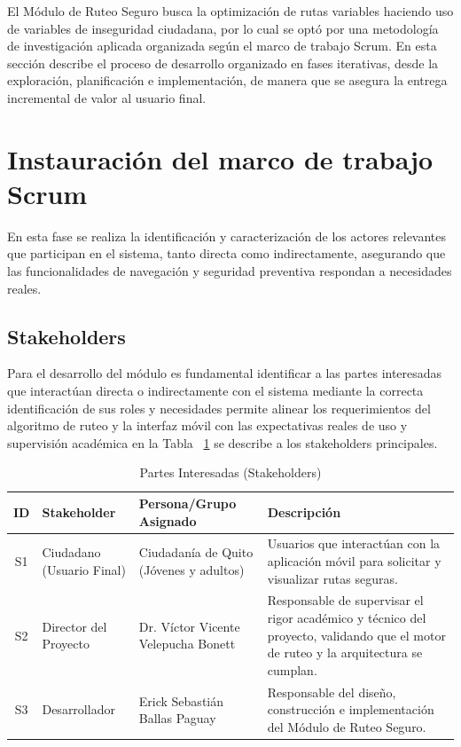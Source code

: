 El Módulo de Ruteo Seguro busca la optimización de rutas variables haciendo uso de variables de inseguridad ciudadana, por lo cual se optó por una metodología de investigación aplicada organizada según el marco de trabajo Scrum. En esta sección describe el proceso de desarrollo organizado en fases iterativas, desde la exploración, planificación e implementación, de manera que se asegura la entrega incremental de valor al usuario final.

\section{Instauración del marco de trabajo Scrum}
En esta fase se realiza la identificación y caracterización de los actores relevantes que participan en el sistema, tanto directa como indirectamente, asegurando que las funcionalidades de navegación y seguridad preventiva respondan a necesidades reales.

\subsection{Stakeholders}
Para el desarrollo del módulo es fundamental identificar a las partes interesadas que interactúan directa o indirectamente con el sistema mediante la correcta identificación de sus roles y necesidades permite alinear los requerimientos del algoritmo de ruteo y la interfaz móvil con las expectativas reales de uso y supervisión académica en la Tabla ~\ref{tab:stakeholders} se describe a los stakeholders principales. 

\begin{table}[H]
\caption{Partes Interesadas (Stakeholders)}
\label{tab:stakeholders}
\centering
\begin{tabular}{|c|p{3cm}|p{3.5cm}|p{7cm}|}
\hline
\textbf{ID} & \textbf{Stakeholder} & \textbf{Persona/Grupo Asignado} & \textbf{Descripción} \\ \hline

S1 & Ciudadano (Usuario Final) & Ciudadanía de Quito (Jóvenes y adultos) & 
Usuarios que interactúan con la aplicación móvil para solicitar y visualizar rutas seguras. \\ \hline

S2 & Director del Proyecto & Dr. Víctor Vicente Velepucha Bonett & 
Responsable de supervisar el rigor académico y técnico del proyecto, validando que el motor de ruteo y la arquitectura se cumplan. \\ \hline

S3 & Desarrollador & Erick Sebastián Ballas Paguay & 
Responsable del diseño, construcción e implementación del Módulo de Ruteo Seguro. \\ \hline
\end{tabular}
\end{table}

